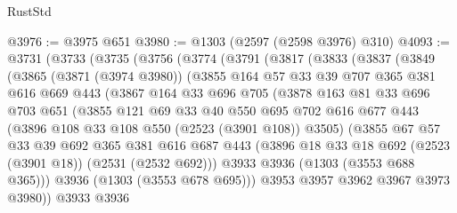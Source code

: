 \begin{lexlean}{RustStd}
\begin{coremodule}
@3976 := @3975 @651
@3980 := @1303 (@2597 (@2598 @3976) @310)
@4093 := @3731
    (@3733
      (@3735
        (@3756
          (@3774
            (@3791
              (@3817
                (@3833
                  (@3837
                    (@3849
                      (@3865
                        (@3871 (@3974 @3980))
                        (@3855
                          @164
                          @57
                          @33
                          @39
                          @707
                          @365
                          @381
                          @616
                          @669
                          @443
                          (@3867
                            @164
                            @33
                            @696
                            @705
                            (@3878
                              @163
                              @81
                              @33
                              @696
                              @703
                              @651
                              (@3855
                                @121
                                @69
                                @33
                                @40
                                @550
                                @695
                                @702
                                @616
                                @677
                                @443
                                (@3896 @108 @33 @108 @550 (@2523 (@3901 @108)) @3505)
                                (@3855
                                  @67
                                  @57
                                  @33
                                  @39
                                  @692
                                  @365
                                  @381
                                  @616
                                  @687
                                  @443
                                  (@3896 @18 @33 @18 @692 (@2523 (@3901 @18)) (@2531 (@2532 @692)))
                                  @3933
                                  @3936
                                  (@1303 (@3553 @688 @365)))
                                @3936
                                (@1303 (@3553 @678 @695)))
                              @3953
                              @3957
                              @3962
                              @3967
                              @3973
                              @3980))
                          @3933
                          @3936

\end{coremodule}
\end{lexlean}
